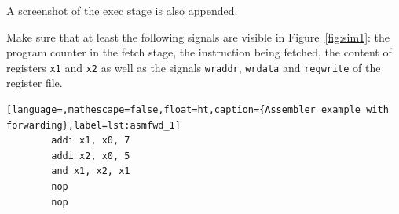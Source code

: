 A screenshot of the exec stage is also appended. 
\newline


Make sure that at least the following signals are visible in
Figure~\ref{fig:sim1}: the program counter in the fetch stage, the
instruction being fetched, the content of registers \texttt{x1} 
and \texttt{x2} as well as the signals \texttt{wraddr},
\texttt{wrdata} and \texttt{regwrite} of the register file.

\begin{lstlisting}[language=,mathescape=false,float=ht,caption={Assembler example with forwarding},label=lst:asmfwd_1]
        addi x1, x0, 7
        addi x2, x0, 5
        and x1, x2, x1
        nop
        nop
\end{lstlisting}

